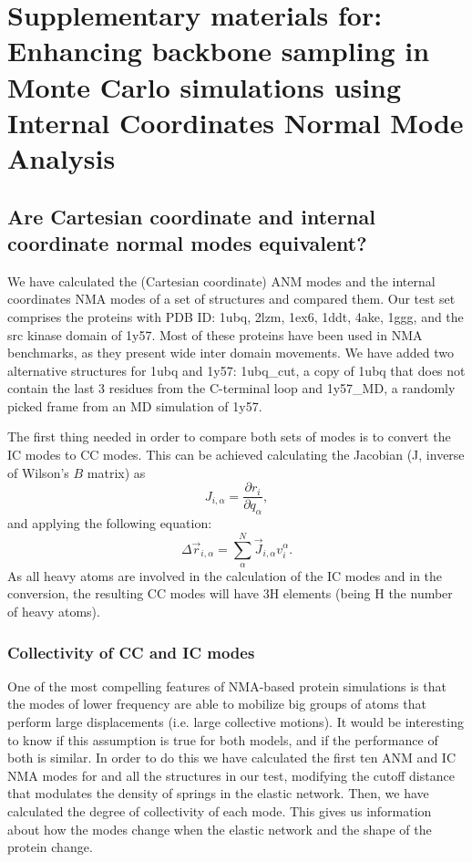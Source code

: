 \section[Supplementary materials: Enhancing sampling]{Supplementary materials for: Enhancing backbone sampling in Monte Carlo simulations using Internal Coordinates Normal Mode Analysis}

\subsection[Are CC and IC modes equivalent?]{Are Cartesian coordinate and internal coordinate normal modes equivalent?}
\label{sec:supp_mat_cc_vs_c}
We have calculated the (Cartesian coordinate) ANM modes and the internal coordinates NMA modes of a set of structures and compared them. Our test set comprises the proteins with PDB ID: 1ubq, 2lzm, 1ex6, 1ddt, 4ake, 1ggg, and the src kinase domain of 1y57. Most of these proteins have been used in NMA benchmarks, as they present wide inter domain movements. We have added two alternative structures for 1ubq and 1y57: 1ubq\_cut, a copy of 1ubq that does not contain the last 3 residues from the C-terminal loop and 1y57\_MD, a randomly picked frame from an MD simulation of 1y57.

The first thing needed in order to compare both sets of modes is to convert the IC modes to CC modes. This can be achieved calculating the Jacobian (J, inverse of Wilson's $B$ matrix) as
\begin{equation}
J_{i,\alpha} = \frac{\partial r_i}{\partial q_\alpha},
\end{equation}
and applying the following equation:
 \begin{equation}
\Delta \vec{r}_{i,\alpha} = \sum_{\alpha}^N \vec{J}_{i,\alpha} v_i^\alpha .
\end{equation}
As all heavy atoms are involved in the calculation of the IC modes and in the conversion, the resulting CC modes will have 3H elements (being H the number of heavy atoms). 

\subsubsection{Collectivity of CC and IC modes}
One of the most compelling features of NMA-based protein simulations is that the modes of lower frequency are able to mobilize big groups of atoms that perform large displacements (i.e. large collective motions). It would be interesting to know if this assumption is true for both models, and if the performance of both is similar. In order to do this we have calculated the first ten ANM and IC NMA modes for and all the structures in our test, modifying the cutoff distance that modulates the density of springs in the elastic network. Then, we have calculated the degree of collectivity of each mode. This gives us information about how the modes change when the elastic network and the shape of the protein change. 

